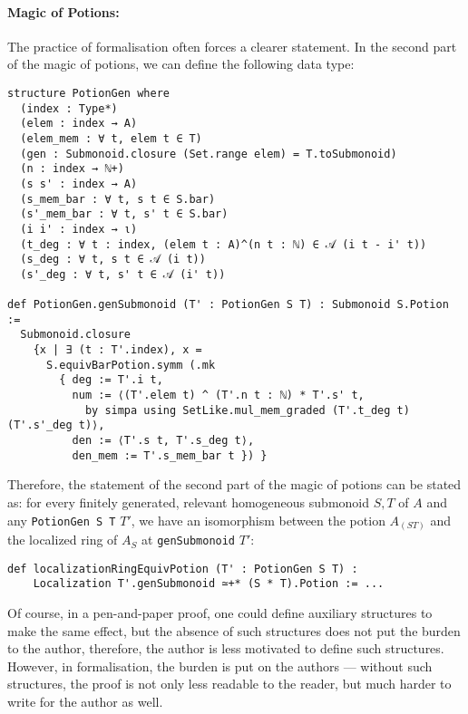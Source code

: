 \documentclass[graybox]{svmult}
\begin{document}
\paragraph{Magic of Potions:}%
The practice of formalisation often forces a clearer statement.
In the second part of the magic of potions, we can define the following data type:
\begin{lstlisting}
structure PotionGen where
  (index : Type*)
  (elem : index → A)
  (elem_mem : ∀ t, elem t ∈ T)
  (gen : Submonoid.closure (Set.range elem) = T.toSubmonoid)
  (n : index → ℕ+)
  (s s' : index → A)
  (s_mem_bar : ∀ t, s t ∈ S.bar)
  (s'_mem_bar : ∀ t, s' t ∈ S.bar)
  (i i' : index → ι)
  (t_deg : ∀ t : index, (elem t : A)^(n t : ℕ) ∈ 𝒜 (i t - i' t))
  (s_deg : ∀ t, s t ∈ 𝒜 (i t))
  (s'_deg : ∀ t, s' t ∈ 𝒜 (i' t))

def PotionGen.genSubmonoid (T' : PotionGen S T) : Submonoid S.Potion :=
  Submonoid.closure
    {x | ∃ (t : T'.index), x =
      S.equivBarPotion.symm (.mk
        { deg := T'.i t,
          num := ⟨(T'.elem t) ^ (T'.n t : ℕ) * T'.s' t,
            by simpa using SetLike.mul_mem_graded (T'.t_deg t) (T'.s'_deg t)⟩,
          den := ⟨T'.s t, T'.s_deg t⟩,
          den_mem := T'.s_mem_bar t }) }
\end{lstlisting}
Therefore, the statement of the second part of the magic of potions can be stated as:
for every finitely generated, relevant homogeneous submonoid $S, T$ of $A$ and any \lstinline|PotionGen S T| $T'$, we have an isomorphism between
the potion $A_{(ST)}$ and the localized ring of $A_S$ at \lstinline|genSubmonoid| $T'$:
\begin{lstlisting}
def localizationRingEquivPotion (T' : PotionGen S T) :
    Localization T'.genSubmonoid ≃+* (S * T).Potion := ...
\end{lstlisting}
Of course, in a pen-and-paper proof, one could define auxiliary structures to make the same effect, 
but the absence of such structures does not put the burden to the author, therefore, the author is 
less motivated to define such structures. However, in formalisation, 
the burden is put on the authors --- without such structures, the proof is not only less readable to the reader, but much harder to write for the author as well.

\end{document}
